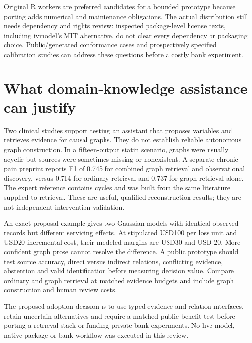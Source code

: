 Original R workers are preferred candidates for a bounded prototype
because porting adds numerical and maintenance obligations. The actual
distribution still needs dependency and rights review: inspected
package-level license texts, including ivmodel's MIT alternative, do not
clear every dependency or packaging choice. Public/generated conformance
cases and prospectively specified calibration studies can address these
questions before a costly bank experiment.
\citep{exec22_riv_gpl2,exec22_riv_gpl3,exec22_riv_ivmodel}

\hypertarget{what-domain-knowledge-assistance-can-justify}{%
\section{What domain-knowledge assistance can
justify}\label{what-domain-knowledge-assistance-can-justify}}

Two clinical studies support testing an assistant that proposes
variables and retrieves evidence for causal graphs. They do not
establish reliable autonomous graph construction. In a fifteen-output
statin scenario, graphs were usually acyclic but sources were sometimes
missing or nonexistent. A separate chronic-pain preprint reports F1 of
0.745 for combined graph retrieval and observational discovery, versus
0.714 for ordinary retrieval and 0.737 for graph retrieval alone. The
expert reference contains cycles and was built from the same literature
supplied to retrieval. These are useful, qualified reconstruction
results; they are not independent intervention
validation.\cite{exec22_domain_aziz,exec22_domain_lin}

An exact proposal example gives two Gaussian models with identical
observed records but different servicing effects. At stipulated USD100
per loss unit and USD20 incremental cost, their modeled margins are
USD30 and USD-20. More confident graph prose cannot resolve the
difference. A public prototype should test source accuracy, direct
versus indirect relations, conflicting evidence, abstention and valid
identification before measuring decision value. Compare ordinary and
graph retrieval at matched evidence budgets and include graph
construction and human review costs.\cite{exec22_domain_reference}

The proposed adoption decision is to use typed evidence and relation
interfaces, retain uncertain alternatives and require a matched public
benefit test before porting a retrieval stack or funding private bank
experiments. No live model, native package or bank workflow was executed
in this review.

